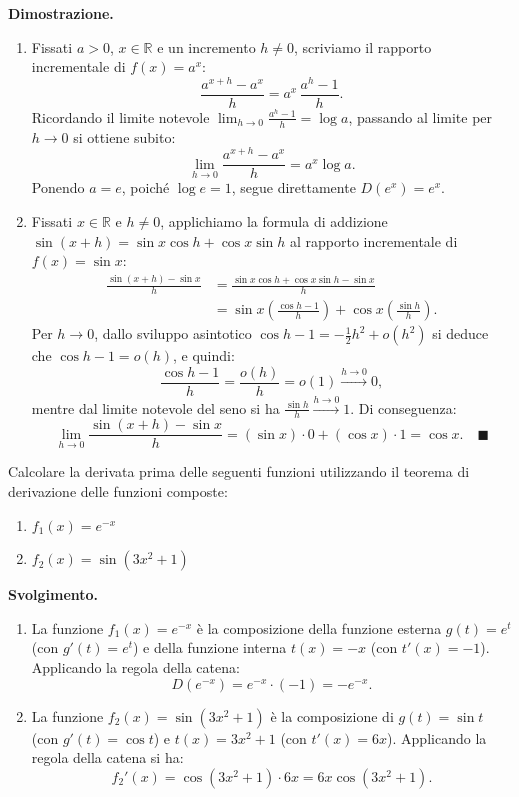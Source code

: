 \noindent\textbf{Dimostrazione.}
\begin{enumerate}
    \item Fissati $a > 0$, $x \in \mathbb{R}$ e un incremento $h \neq 0$, scriviamo il rapporto incrementale di $f(x) = a^x$:
    \[
        \frac{a^{x+h} - a^x}{h} = a^x \, \frac{a^h - 1}{h}.
    \]
    Ricordando il limite notevole $\lim_{h \to 0} \frac{a^h - 1}{h} = \log a$, passando al limite per $h \to 0$ si ottiene subito:
    \[
        \lim_{h \to 0} \frac{a^{x+h} - a^x}{h} = a^x \log a.
    \]
    Ponendo $a = e$, poiché $\log e = 1$, segue direttamente $D(e^x) = e^x$.

    \item Fissati $x \in \mathbb{R}$ e $h \neq 0$, applichiamo la formula di addizione $\sin(x + h) = \sin x \cos h + \cos x \sin h$ al rapporto incrementale di $f(x) = \sin x$:
    \begin{align*}
        \frac{\sin(x+h) - \sin x}{h} &= \frac{\sin x \cos h + \cos x \sin h - \sin x}{h} \\
        &= \sin x \left(\frac{\cos h - 1}{h}\right) + \cos x \left(\frac{\sin h}{h}\right).
    \end{align*}
    Per $h \to 0$, dallo sviluppo asintotico $\cos h - 1 = -\frac{1}{2}h^2 + o(h^2)$ si deduce che $\cos h - 1 = o(h)$, e quindi:
    \[
        \frac{\cos h - 1}{h} = \frac{o(h)}{h} = o(1) \xrightarrow{h \to 0} 0,
    \]
    mentre dal limite notevole del seno si ha $\frac{\sin h}{h} \xrightarrow{h \to 0} 1$. Di conseguenza:
    \[
        \lim_{h \to 0} \frac{\sin(x+h) - \sin x}{h} = (\sin x) \cdot 0 + (\cos x) \cdot 1 = \cos x. \quad \blacksquare
    \]
\end{enumerate}

\begin{esbox}
Calcolare la derivata prima delle seguenti funzioni utilizzando il teorema di derivazione delle funzioni composte:
\begin{enumerate}
    \item $f_1(x) = e^{-x}$
    \item $f_2(x) = \sin(3x^2 + 1)$
\end{enumerate}

\medskip
\noindent\textbf{Svolgimento.}
\begin{enumerate}
    \item La funzione $f_1(x) = e^{-x}$ è la composizione della funzione esterna $g(t) = e^t$ (con $g'(t) = e^t$) e della funzione interna $t(x) = -x$ (con $t'(x) = -1$). Applicando la regola della catena:
    \[
        D(e^{-x}) = e^{-x} \cdot (-1) = -e^{-x}.
    \]

    \item La funzione $f_2(x) = \sin(3x^2 + 1)$ è la composizione di $g(t) = \sin t$ (con $g'(t) = \cos t$) e $t(x) = 3x^2 + 1$ (con $t'(x) = 6x$). Applicando la regola della catena si ha:
    \[
        f_2'(x) = \cos(3x^2 + 1) \cdot 6x = 6x\cos(3x^2 + 1).
    \]
\end{enumerate}
\end{esbox}

